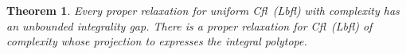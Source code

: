 \documentclass[11pt]{article}
\newtheorem{theorem}{Theorem}[section]
\newcommand{\lbfl}{{\sc Lbfl}}
\newcommand{\cfl}{{\sc Cfl}}
\begin{document}
\vspace*{-0.1cm}
\begin{theorem}\label{theorem:proper}
Every proper relaxation for uniform \cfl\ (\lbfl) with complexity  has an
unbounded integrality gap. There is a proper  relaxation for
\cfl\ (\lbfl) of  complexity   whose projection to  expresses the integral polytope. 
\end{theorem}



\begin{comment}
\paragraph*{Proof sketch of Theorem~\ref{theorem:proper}.}
We are given an arbitrary proper relaxation  of
complexity  for an instance with  facilities, 
clients and , and the following metric distances: 
put every facility    together with  clients, which we call \emph{exclusive} clients of ,  on a
distinct vertex of an -dimensional regular simplex in  with edge length
. Put facilities  together with their exclusive clients, which are all the  remaining clients, to a point
far away  from the simplex, so  the minimum distance from  a vertex is
. We set all the facility costs to .


A major challenge is that we have no a priori knowledge of  
We use the validity of  and the fact that 
to prove that there  is a class  with some desired properties
that must
belong to  
Using classes that are symmetric to  which also must belong to
  we construct a vector  that is feasible for
  and  whose projection  on the classic  variables is
 the  following  : for  each  facility    its
 exclusive   clients  are   assigned  to   it  with   a   fraction  of
  each, while they  are assigned with a fraction of
  to each other facility  . As for
 facilities , all of  their exclusive clients are assigned with
 a fraction of  to each.  Moreover  for
  and .

The  cost  of  the fractional  solution  we  constructed  is
 due to the assignments  of exclusive clients of
facility   to facilities  with   
As  for the cost  of an arbitrary integral  solution, observe
that since the  exclusive  clients of  are very far from
the  rest of  the facilities,  using   of them  to  satisfy some
demand of  those facilities and help  to open all of  them, incurs a
cost of  On the other hand, if we do not open all of the 
facilities on  the vertices of the  simplex (since they  have in total
  exclusive clients  which is  not enough  to open  all of
them), there  must be  at least  one such facility  not opened  in the
solution, thus its  exclusive clients must be assigned elsewhere,
incurring a cost of  
\end{comment}
\end{document}
